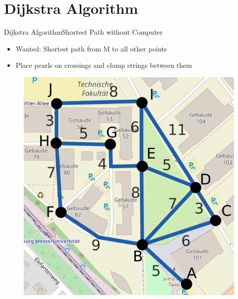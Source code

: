 \section{Dijkstra Algorithm}

\begin{frame}{Dijkstra Algorithm}{Shortest Path without Computer}
  \begin{itemize}
    \item
      Wanted: Shortest path from M to all other points
    \item
      Place pearls on crossings and clamp strings between them
  \end{itemize}
  \begin{figure}
    \includegraphics[width=0.45\linewidth]{Images/Dijkstra/DijkstraMapTF.png}
  \end{figure}
\end{frame}


